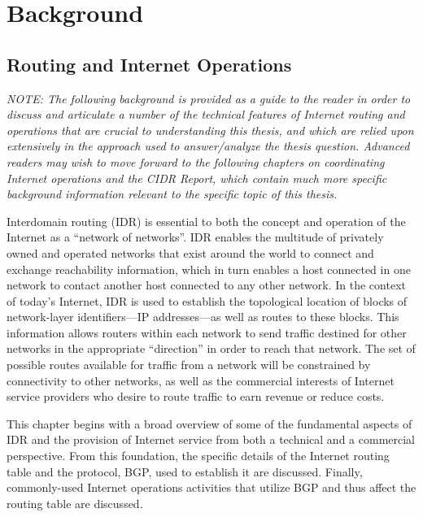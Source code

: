 \chapter{Background} \label{chap:background}


\section{Routing and Internet Operations}

\emph{NOTE: The following background is provided as a guide to the reader in
order to discuss and articulate a number of the technical features of Internet
routing and operations that are crucial to understanding this thesis, and which
are relied upon extensively in the approach used to answer/analyze the thesis
question. Advanced readers may wish to move forward to the following chapters
on coordinating Internet operations and the CIDR Report, which contain much
more specific background information relevant to the specific topic of this
thesis.}

Interdomain routing (IDR) is essential to both the concept and operation of the
Internet as a ``network of networks''. IDR enables the multitude of privately
owned and operated networks that exist around the world to connect and exchange
reachability information, which in turn enables a host connected in one network
to contact another host connected to any other network. In the context of
today's Internet, IDR is used to establish the topological location of blocks
of network-layer identifiers---IP addresses---as well as routes to these
blocks. This information allows routers within each network to send traffic
destined for other networks in the appropriate ``direction'' in order to reach
that network. The set of possible routes available for traffic from a network
will be constrained by connectivity to other networks, as well as the
commercial interests of Internet service providers who desire to route traffic
to earn revenue or reduce costs.

This chapter begins with a broad overview of some of the fundamental aspects of
IDR and the provision of Internet service from both a technical and a
commercial perspective. From this foundation, the specific details of the
Internet routing table and the protocol, BGP, used to establish it are
discussed. Finally, commonly-used Internet operations activities that utilize
BGP and thus affect the routing table are discussed.

